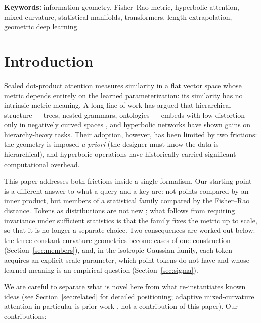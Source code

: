 \documentclass[11pt]{article}
\begin{document}
\noindent\textbf{Keywords:} information geometry, Fisher--Rao metric, hyperbolic attention, mixed curvature, statistical manifolds, transformers, length extrapolation, geometric deep learning.

\section{Introduction}

Scaled dot-product attention measures similarity in a flat vector space whose metric depends entirely on the learned parameterization: its similarity has no intrinsic metric meaning. A long line of work has argued that hierarchical structure --- trees, nested grammars, ontologies --- embeds with low distortion only in negatively curved spaces \cite{nickel2017,gulcehre2019,gu2019}, and hyperbolic networks have shown gains on hierarchy-heavy tasks. Their adoption, however, has been limited by two frictions: the geometry is imposed \emph{a priori} (the designer must know the data is hierarchical), and hyperbolic operations have historically carried significant computational overhead.

This paper addresses both frictions inside a single formalism. Our starting point is a different answer to what a query and a key are: not points compared by an inner product, but members of a statistical family compared by the Fisher--Rao distance. Tokens as distributions are not new \cite{vilnis2015,erick2023stochastic,fan2022stosa}; what follows from requiring invariance under sufficient statistics is that the family fixes the metric up to scale, so that it is no longer a separate choice. Two consequences are worked out below: the three constant-curvature geometries become cases of one construction (Section~\ref{sec:members}), and, in the isotropic Gaussian family, each token acquires an explicit scale parameter, which point tokens do not have and whose learned meaning is an empirical question (Section~\ref{sec:sigma}).

We are careful to separate what is novel here from what re-instantiates known ideas (see Section~\ref{sec:related} for detailed positioning; adaptive mixed-curvature attention in particular is prior work \cite{lin2025cat,cho2023curve,he2025helm}, not a contribution of this paper). Our contributions:
\end{document}
